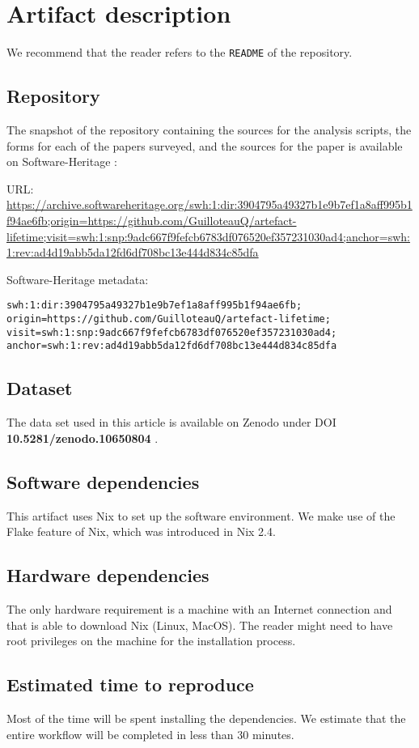 \documentclass[sigconf,natbib=false]{acmart}
\begin{document}
\newpage

\appendix

\section{Artifact description}

We recommend that the reader refers to the \texttt{README} of the repository.

\subsection{Repository}

The snapshot of the repository containing the sources for the analysis scripts, the forms for each of the papers surveyed, and the sources for the paper is available on Software-Heritage \cite{artefact-lifetime}:

URL: \url{https://archive.softwareheritage.org/swh:1:dir:3904795a49327b1e9b7ef1a8aff995b1f94ae6fb;origin=https://github.com/GuilloteauQ/artefact-lifetime;visit=swh:1:snp:9adc667f9fefcb6783df076520ef357231030ad4;anchor=swh:1:rev:ad4d19abb5da12fd6df708bc13e444d834c85dfa}

Software-Heritage metadata:

\begin{verbatim}
swh:1:dir:3904795a49327b1e9b7ef1a8aff995b1f94ae6fb;
origin=https://github.com/GuilloteauQ/artefact-lifetime;
visit=swh:1:snp:9adc667f9fefcb6783df076520ef357231030ad4;
anchor=swh:1:rev:ad4d19abb5da12fd6df708bc13e444d834c85dfa
\end{verbatim}

\subsection{Dataset}

The data set used in this article is available on Zenodo under DOI \textbf{10.5281/zenodo.10650804} \cite{guilloteau_2024_10650804}.

\subsection{Software dependencies}

This artifact uses Nix to set up the software environment.
We make use of the Flake feature of Nix, which was introduced in Nix 2.4.

\subsection{Hardware dependencies}

The only hardware requirement is a machine with an Internet connection and that is able to download Nix (Linux, MacOS).
The reader might need to have root privileges on the machine for the installation process.

\subsection{Estimated time to reproduce}

Most of the time will be spent installing the dependencies.
We estimate that the entire workflow will be completed in less than 30 minutes.
\end{document}
